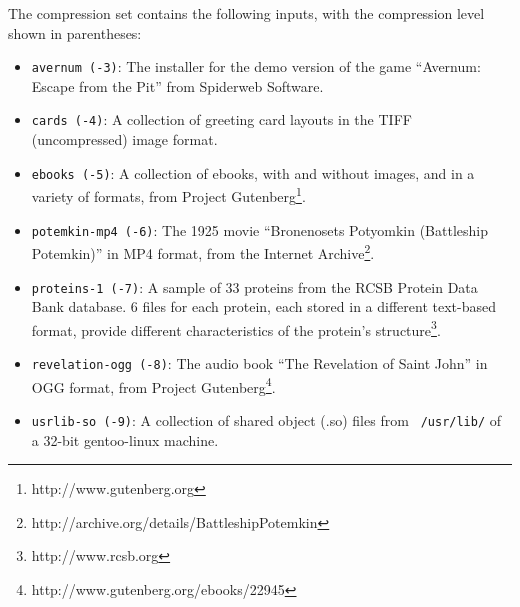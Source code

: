 The compression set contains the following inputs, with the
compression level shown in parentheses:
\begin{itemize}

\item {\tt avernum (-3)}: The installer for the demo version of the game
  ``Avernum: Escape from the Pit'' from Spiderweb Software.

\item {\tt cards (-4)}: A collection of greeting card layouts in the TIFF 
  (uncompressed) image format.

\item {\tt ebooks (-5)}: A collection of ebooks, with and without images,
  and in a variety of formats, from Project
  Gutenberg\footnote{http://www.gutenberg.org}.

\item {\tt potemkin-mp4 (-6)}: The 1925 movie ``Bronenosets Potyomkin
  (Battleship Potemkin)'' in MP4 format, from the Internet
  Archive\footnote{http://archive.org/details/BattleshipPotemkin}.

\item {\tt proteins-1 (-7)}: A sample of 33 proteins from the RCSB Protein Data
  Bank database.  6 files for each protein, each stored in a different
  text-based format, provide different characteristics of the protein's
  structure\footnote{http://www.rcsb.org}.

\item {\tt revelation-ogg (-8)}: The audio book ``The Revelation of Saint
  John'' in OGG format, from Project
  Gutenberg\footnote{http://www.gutenberg.org/ebooks/22945}.

\item {\tt usrlib-so (-9)}: A collection of shared object (.so) files from {\tt
  /usr/lib/} of a 32-bit gentoo-linux machine.

\end{itemize}

